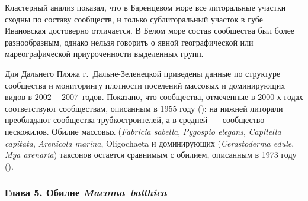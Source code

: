 {Кластерный анализ показал, что в Баренцевом море все литоральные участки сходны по составу сообществ, и только сублиторальный участок в губе Ивановская достоверно отличается.
В Белом море состав сообщества был более разнообразным, однако нельзя говорить о явной географической или мареографической приуроченности выделенных групп.

Для Дальнего Пляжа г.~Дальне-Зеленецкой приведены данные по структуре сообщества и мониторингу плотности поселений массовых и доминирующих видов в $2002 - 2007$~годов.
Показано, что сообщества, отмеченные в 2000-х годах соответствуют сообществам, описанным в 1955 году (\cite{Matveeva_et_al_1955}): на нижней литорали преобладают сообщества трубкостроителей, а в средней~--- сообщество пескожилов. 
Обилие массовых ({\it Fabricia sabella}, {\it Pygospio elegans}, {\it Capitella capitata}, {\it Arenicola marina}, Oligochaeta и доминирующих ({\it Cerastoderma edule}, {\it Mya arenaria}) таксонов остается сравнимым с обилием, описанным в 1973 году (\cite{Agarova_et_al_1976}).

\subsubsection*{Глава 5. Обилие \textit{Macoma~balthica}}

}
